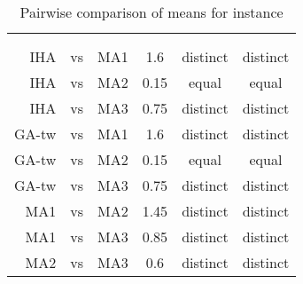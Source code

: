 \documentclass[thesis.tex]{subfiles}
\newcommand{\CurrentInstance}{}
\newcommand{\CurrentInstanceFileEscaped}{}
\newcommand{\CurrentInstanceTexEscaped}{}
\begin{document}
   \renewcommand{\CurrentInstanceTexEscaped}{1a62}


\begin{table}[htbp]
   \caption{Pairwise comparison of means for instance \CurrentInstance}
   \label{fig:\CurrentInstanceFileEscaped-mannwhitneyu}
   \centering\small
      \begin{tabular}{r@{\ }c@{\ }l S[table-format=2.2] c c} \toprule
         &&&                          &  \\ \cmidrule(lr){5-6}
         &&&  &  &  \\ \midrule

         \gls{IHA} &vs& \gls{MA1}   &  1.6  & distinct & distinct \\
         \gls{IHA} &vs& \gls{MA2}   &  0.15 &  equal   &  equal   \\
         \gls{IHA} &vs& \gls{MA3}   &  0.75 & distinct & distinct \\
         \gls{GA-tw} &vs& \gls{MA1} &  1.6  & distinct & distinct \\
         \gls{GA-tw} &vs& \gls{MA2} &  0.15 &  equal   &  equal   \\
         \gls{GA-tw} &vs& \gls{MA3} &  0.75 & distinct & distinct \\
         \gls{MA1} &vs& \gls{MA2}   &  1.45 & distinct & distinct \\
         \gls{MA1} &vs& \gls{MA3}   &  0.85 & distinct & distinct \\
         \gls{MA2} &vs& \gls{MA3}   &  0.6  & distinct & distinct \\
         \bottomrule
      \end{tabular}
\end{table}
   \renewcommand{\CurrentInstance}{\Instance{1sem}}
   \renewcommand{\CurrentInstanceFileEscaped}{1sem}
   \renewcommand{\CurrentInstanceTexEscaped}{1sem}


   \renewcommand{\CurrentInstance}{\Instance{1pwt}}
   \renewcommand{\CurrentInstanceFileEscaped}{1pwt}
   \renewcommand{\CurrentInstanceTexEscaped}{1pwt}

\end{document}
